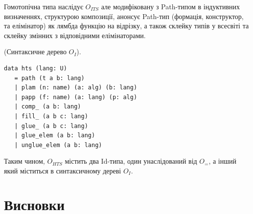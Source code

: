 Гомотопічна типа наслідує $O_{ITS}$ але модифіковану з
Path-типом в індуктивних визначеннях, структурою композиції,
анонсує Path-тип (формація, конструктор, та елімінатор)
як лямбда функцію на відрізку, а також склейку типів у всесвіті
та склейку змінних з відповідними елімінаторами.

\begin{definition} (Синтаксичне дерево $O_I$).
\begin{lstlisting}
data hts (lang: U)
   = path (t a b: lang)
   | plam (n: name) (a: alg) (b: lang)
   | papp (f: name) (a: lang) (p: alg)
   | comp_ (a b: lang)
   | fill_ (a b c: lang)
   | glue_ (a b c: lang)
   | glue_elem (a b: lang)
   | unglue_elem (a b: lang)
\end{lstlisting}
\end{definition}

Таким чином,
$O_{HTS}$ містить два Id-типа, один унаслідований від $O_=$,
а інший який міститься в синтаксичному дереві $O_I$.

\section{Висновки}